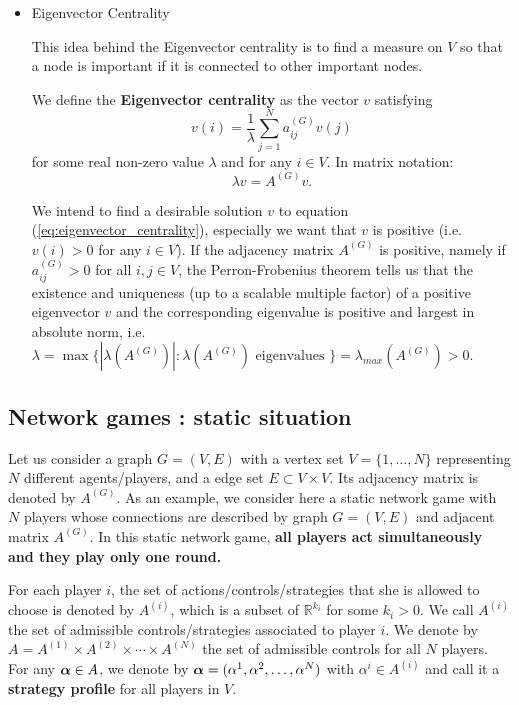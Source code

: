 \begin{itemize}
	\item Eigenvector Centrality \cite{Bonacich1972b} \cite{Bonacich1972}
	
	This idea behind the Eigenvector centrality is to find a measure on $V$ so that a node is important if it is connected to other important nodes.
	
	\begin{definition}
		We define the \textbf{Eigenvector centrality} as the vector $v$ satisfying
		\begin{equation}
		v(i) = \frac{1}{\lambda} \sum_{j=1}^N a_{ij}^{(G)} v(j) 
		\end{equation}
		for some real non-zero value $\lambda$ and for any $i \in V$. In matrix notation:
		\begin{equation}
		\lambda v = A^{(G)} v.
		\label{eq:eigenvector_centrality}
		\end{equation}
	\end{definition}
	
	We intend to find a desirable solution $v$ to equation (\ref{eq:eigenvector_centrality}), especially we want that $v$ is positive (i.e. $v(i)>0$ for any $i\in V$). If the adjacency matrix $A^{(G)}$ is positive, namely if $a_{ij}^{(G)} >0$ for all $i,j \in V$, the Perron-Frobenius theorem tells us that the existence and uniqueness (up to a scalable multiple factor) of a positive eigenvector $v$ and the corresponding eigenvalue is positive and largest in absolute norm, i.e. $\lambda = \max\{ |\lambda(A^{(G)})|: \lambda(A^{(G)}) \text{ eigenvalues } \} = \lambda_{max}(A^{(G)}) > 0$.
	
	
	
\end{itemize}


\subsection{Network games : static situation}

Let us consider a graph $G=(V,E)$ with a vertex set $V=\{1,\ldots, N\}$ representing $N$ different agents/players, and a edge set $E \subset V \times V$. Its adjacency matrix is denoted by $A^{(G)}$. 
As an example, we consider here a static network game with $N$ players whose connections are described by graph $G=(V,E)$ and adjacent matrix $A^{(G)}$. In this static network game, \textbf{all players act simultaneously and they play only one round.}

For each player $i$, the set of actions/controls/strategies that she is allowed to choose is denoted by $A^{(i)}$, which is a subset of $\mathbb{R}^{k_i}$ for some $k_i > 0$. We call $A^{(i)}$ the set of admissible controls/strategies associated to player $i$.
We denote by $A = A^{(1)} \times A^{(2)} \times \cdots \times A^{(N)}$ the set of admissible controls for all $N$ players. For any $\boldsymbol{\alpha} \in A$, we denote by $\boldsymbol{\alpha} = (\alpha^1, \alpha^2,\ldots, \alpha^N)$ with $\alpha^i \in A^{(i)}$ and call it a \textbf{strategy profile} for all players in $V$.

